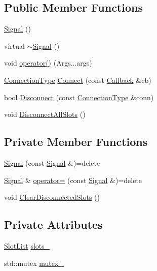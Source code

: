 \subsection*{Public Member Functions}
\begin{DoxyCompactItemize}
\item 
\hyperlink{classapollo_1_1cyber_1_1base_1_1Signal_ad62083ac992903de39e23a596fc8c10a}{Signal} ()
\item 
virtual \hyperlink{classapollo_1_1cyber_1_1base_1_1Signal_a222c79147fd7b564d9da73804d31821e}{$\sim$\-Signal} ()
\item 
void \hyperlink{classapollo_1_1cyber_1_1base_1_1Signal_a212ad3069a927d4aaf4be3d920c6b30a}{operator()} (Args...\-args)
\item 
\hyperlink{classapollo_1_1cyber_1_1base_1_1Signal_a4fb76535f693654bd1afd5d338d85193}{Connection\-Type} \hyperlink{classapollo_1_1cyber_1_1base_1_1Signal_aff67dfcf03742f69ae2defe42a478c71}{Connect} (const \hyperlink{classapollo_1_1cyber_1_1base_1_1Signal_a85f3c9d95bb2885c4d09cce1542ab049}{Callback} \&cb)
\item 
bool \hyperlink{classapollo_1_1cyber_1_1base_1_1Signal_ada03325f51ddc97a90711251c2515f72}{Disconnect} (const \hyperlink{classapollo_1_1cyber_1_1base_1_1Signal_a4fb76535f693654bd1afd5d338d85193}{Connection\-Type} \&conn)
\item 
void \hyperlink{classapollo_1_1cyber_1_1base_1_1Signal_aa5df08abb7f3da658fc08fcf1b637b04}{Disconnect\-All\-Slots} ()
\end{DoxyCompactItemize}
\subsection*{Private Member Functions}
\begin{DoxyCompactItemize}
\item 
\hyperlink{classapollo_1_1cyber_1_1base_1_1Signal_accb1330b6b277f4979543db20b971082}{Signal} (const \hyperlink{classapollo_1_1cyber_1_1base_1_1Signal}{Signal} \&)=delete
\item 
\hyperlink{classapollo_1_1cyber_1_1base_1_1Signal}{Signal} \& \hyperlink{classapollo_1_1cyber_1_1base_1_1Signal_a9b0552bc732401ecedcd025df6928dbe}{operator=} (const \hyperlink{classapollo_1_1cyber_1_1base_1_1Signal}{Signal} \&)=delete
\item 
void \hyperlink{classapollo_1_1cyber_1_1base_1_1Signal_a3162fed83a227091be77f8cd9cd537e8}{Clear\-Disconnected\-Slots} ()
\end{DoxyCompactItemize}
\subsection*{Private Attributes}
\begin{DoxyCompactItemize}
\item 
\hyperlink{classapollo_1_1cyber_1_1base_1_1Signal_a902c7f3a2c9bd9debeb0d7a52dc501bf}{Slot\-List} \hyperlink{classapollo_1_1cyber_1_1base_1_1Signal_a8b2235cb5214ea2dde45e5b2f678112b}{slots\-\_\-}
\item 
std\-::mutex \hyperlink{classapollo_1_1cyber_1_1base_1_1Signal_ae4fbfc9ce2e69ed7fb06aca207f44c70}{mutex\-\_\-}
\end{DoxyCompactItemize}


